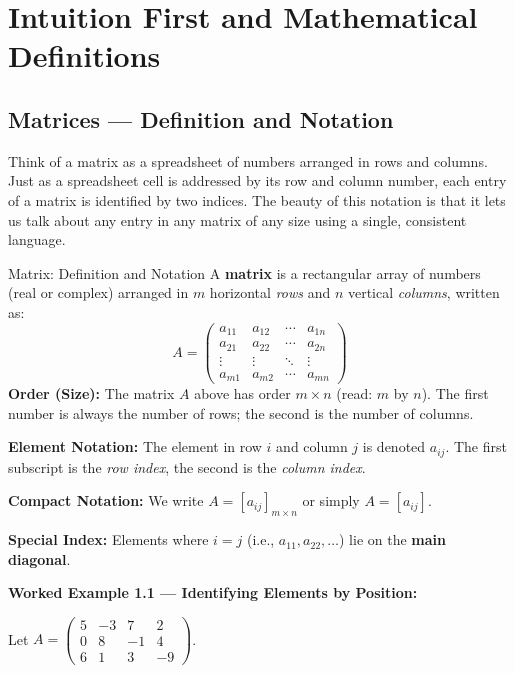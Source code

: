 \documentclass[12pt,a4paper]{article}
\begin{document}
\section{Intuition First and Mathematical Definitions}

\subsection{Matrices --- Definition and Notation}

Think of a matrix as a spreadsheet of numbers arranged in rows and columns. Just as a spreadsheet cell is addressed by its row and column number, each entry of a matrix is identified by two indices. The beauty of this notation is that it lets us talk about any entry in any matrix of any size using a single, consistent language.

\begin{infobox}{Matrix: Definition and Notation}
A \textbf{matrix} is a rectangular array of numbers (real or complex) arranged in $m$ horizontal \emph{rows} and $n$ vertical \emph{columns}, written as:
\[
A = \begin{pmatrix} a_{11} & a_{12} & \cdots & a_{1n} \\ a_{21} & a_{22} & \cdots & a_{2n} \\ \vdots & \vdots & \ddots & \vdots \\ a_{m1} & a_{m2} & \cdots & a_{mn} \end{pmatrix}
\]
\textbf{Order (Size):} The matrix $A$ above has order $m \times n$ (read: $m$ by $n$). The first number is always the number of rows; the second is the number of columns.

\textbf{Element Notation:} The element in row $i$ and column $j$ is denoted $a_{ij}$. The first subscript is the \emph{row index}, the second is the \emph{column index}.

\textbf{Compact Notation:} We write $A = [a_{ij}]_{m \times n}$ or simply $A = [a_{ij}]$.

\textbf{Special Index:} Elements where $i = j$ (i.e., $a_{11}, a_{22}, \ldots$) lie on the \textbf{main diagonal}.
\end{infobox}

\textbf{Worked Example 1.1 --- Identifying Elements by Position:}

Let $A = \begin{pmatrix} 5 & -3 & 7 & 2 \\ 0 & 8 & -1 & 4 \\ 6 & 1 & 3 & -9 \end{pmatrix}$.
\end{document}
